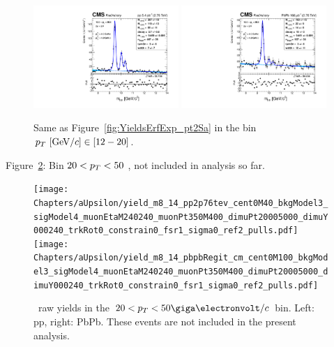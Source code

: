 \begin{figure}
  \includegraphics[width=0.49\textwidth]{Chapters/aYield/pp/pt_4_4/Pt/Pt_12_20/pp2p76tev_Pt_12_20_fsr1.pdf}  
  \includegraphics[width=0.49\textwidth]{Chapters/aYield/PbPb/pt_4_4/Pt/Pt_12_20/PbPb_Pt_12_20_fsr1.pdf} 
  \caption{Same as Figure~\ref{fig:YieldsErfExp_pt2Sa} in the bin $p_{T}~[{\rm GeV}/c]\in [12 - 20]$.}
  \label{fig:YieldsErfExp_pt2Sc} 
\end{figure}

Figure~\ref{fig:extrabin}: Bin $20 < p_{T} < 50$ \GeVc, not included in
analysis so far.
\begin{figure}
\begin{centering}  
  \texttt{[image: Chapters/aUpsilon/yield\_m8\_14\_pp2p76tev\_cent0M40\_bkgModel3\_sigModel4\_muonEtaM240240\_muonPt350M400\_dimuPt20005000\_dimuY000240\_trkRot0\_constrain0\_fsr1\_sigma0\_ref2\_pulls.pdf]}
  \texttt{[image: Chapters/aUpsilon/yield\_m8\_14\_pbpbRegit\_cm\_cent0M100\_bkgModel3\_sigModel4\_muonEtaM240240\_muonPt350M400\_dimuPt20005000\_dimuY000240\_trkRot0\_constrain0\_fsr1\_sigma0\_ref2\_pulls.pdf]}
  \caption{\PgU\ raw yields in the $20 < \pt < 50 \GeVc$ bin. Left:
    pp, right: PbPb. These events are not included in the present analysis.}
  \label{fig:extrabin}
\end{centering}  
\end{figure}

